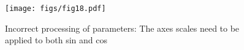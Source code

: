 \begin{figure}
    \centering
    \texttt{[image: figs/fig18.pdf]}
    \vspace{-7pt}
    \caption{Incorrect processing of parameters: The axes scales need to be applied to both sin and cos
    }
    \label{fig:discussion2}
    \vspace{-10pt}
\end{figure}